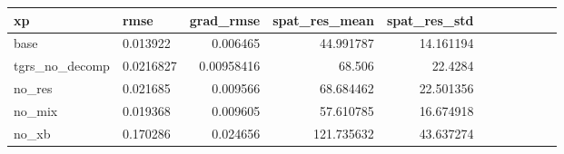 \begin{tabular}{llrrrrrrrrr}
\toprule
{}            xp &       rmse &   grad\_rmse &   spat\_res\_mean &  spat\_res\_std & \\
\midrule
     base &    0.013922 &    0.006465 &          44.991787 &     14.161194 &   \\
tgrs\_no\_decomp & 0.0216827 &   0.00958416 &  68.506 &  22.4284 \\
   no\_res &   0.021685 &    0.009566 &          68.684462 &     22.501356 &   \\
   no\_mix &   0.019368 &    0.009605 &          57.610785 &     16.674918 &   \\
   no\_xb &   0.170286 &    0.024656 &         121.735632 &     43.637274 &   \\
\bottomrule
\end{tabular}

